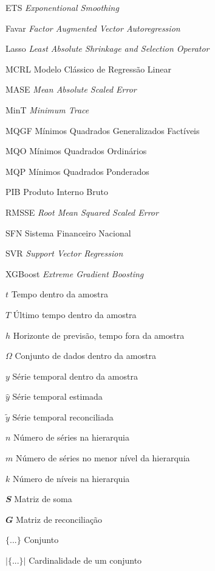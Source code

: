 \listoffigures*
\cleardoublepage


\listoftables*
\cleardoublepage

\begin{siglas}
  \item[ETS] \textit{Exponentional Smoothing}
  \item[Favar] \textit{Factor Augmented Vector Autoregression}
  \item[Lasso] \textit{Least Absolute Shrinkage and Selection Operator}
  \item[MCRL] Modelo Clássico de Regressão Linear
  \item[MASE] \textit{Mean Absolute Scaled Error}
  \item[MinT] \textit{Minimum Trace}
  \item[MQGF] Mínimos Quadrados Generalizados Factíveis
  \item[MQO] Mínimos Quadrados Ordinários
  \item[MQP] Mínimos Quadrados Ponderados
  \item[PIB] Produto Interno Bruto
  \item[RMSSE] \textit{Root Mean Squared Scaled Error}
  \item[SFN] Sistema Financeiro Nacional
  \item[SVR] \textit{Support Vector Regression}
  \item[XGBoost] \textit{Extreme Gradient Boosting}
\end{siglas}

\begin{simbolos}
  \item[$ t $] Tempo dentro da amostra
  \item[$ T $] Último tempo dentro da amostra
  \item[$ h $] Horizonte de previsão, tempo fora da amostra
  \item[$ \Omega $] Conjunto de dados dentro da amostra
  \item[$ y $] Série temporal dentro da amostra
  \item[$ \hat{y} $] Série temporal estimada
  \item[$ \tilde{y} $] Série temporal reconciliada
  \item[$ n $] Número de séries na hierarquia
  \item[$ m $] Número de séries no menor nível da hierarquia
  \item[$ k $] Número de níveis na hierarquia
  \item[$ \mathbfit{S} $] Matriz de soma
  \item[$ \mathbfit{G} $] Matriz de reconciliação
  \item[$\{...\}$] Conjunto
  \item[$|\{...\}|$] Cardinalidade de um conjunto
\end{simbolos}

\tableofcontents*
\cleardoublepage

\textual
\pagestyle{simple}